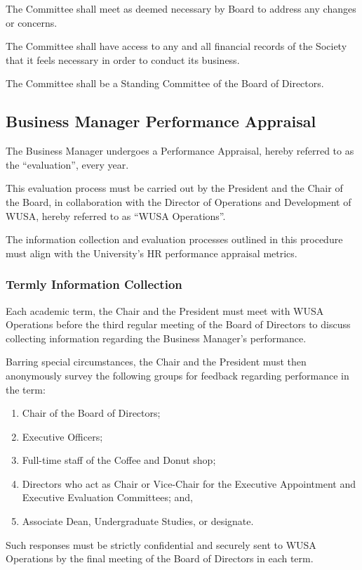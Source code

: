 The Committee shall meet as deemed necessary by Board to address any changes or concerns.

The Committee shall have access to any and all financial records of the Society
that it feels necessary in order to conduct its business.

The Committee shall be a Standing Committee of the Board of Directors.

\subsection{Business Manager Performance Appraisal}
The Business Manager undergoes a Performance Appraisal, hereby referred to as the “evaluation”, every year. 

This evaluation process must be carried out by the President and the Chair of the Board, in collaboration with the Director of Operations and Development of WUSA, hereby referred to as “WUSA Operations”. 

The information collection and evaluation processes outlined in this procedure must align with the University’s HR performance appraisal metrics.

\subsubsection{Termly Information Collection}
Each academic term, the Chair and the President must meet with WUSA Operations before the third regular meeting of the Board of Directors to discuss collecting information regarding the Business Manager’s performance.

Barring special circumstances, the Chair and the President must then anonymously survey the following groups for feedback regarding performance in the term:

\begin{enumerate}
\item{Chair of the Board of Directors;}
\item{Executive Officers;}
\item{Full-time staff of the Coffee and Donut shop;}
\item{Directors who act as Chair or Vice-Chair for the Executive Appointment and Executive Evaluation Committees; and,}
\item{Associate Dean, Undergraduate Studies, or designate.}
\end{enumerate}

Such responses must be strictly confidential and securely sent to WUSA Operations by the final meeting of the Board of Directors in each term.

